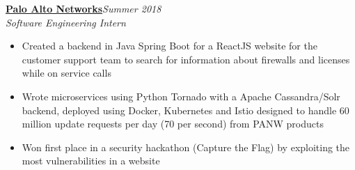 \documentclass[letterpaper,8pt]{article}
\newcommand{\resitem}[1]{\item #1 \vspace{-1pt}}
\begin{document}
{\begin{itemize}
\small{\item
    \textbf{\href{https://www.paloaltonetworks.com/}{\small{Palo Alto Networks}}}\hfill{\textit{Summer 2018}} \\
    \textit{\small{Software Engineering Intern}}
	\begin{itemize}[noitemsep,nolistsep]
		\resitem{\small{Created a backend in Java Spring Boot for a ReactJS website for the customer support team to search for information about firewalls and licenses while on service calls}}
		\resitem{\small{Wrote microservices using Python Tornado with a Apache Cassandra/Solr backend, deployed using Docker,  Kubernetes and Istio designed to handle 60 million update requests per day (70 per second) from PANW products}}
		\resitem{\small{Won first place in a security hackathon (Capture the Flag) by exploiting the most vulnerabilities in a website}}
	\end{itemize}




}
\end{itemize}}
\end{document}
